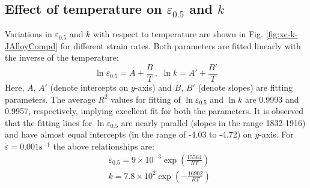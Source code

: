 \documentclass[a4paper, 11pt, dvipsnames]{article}
\begin{document}
\subsection{Effect of temperature on \texorpdfstring{$\varepsilon_{0.5}$}{e0.5} and \texorpdfstring{$k$}{k}}
Variations in $\varepsilon_{0.5}$ and $k$ with respect to temperature are shown in Fig. \ref{fig:xc-k-JAlloyCompd} for different strain rates. Both parameters are fitted linearly with the inverse of the temperature:
\begin{equation}\label{eq:e50-k-T}
\ln\varepsilon_{0.5} = A + \frac{B}{T} \, , \,\, \ln k = A' + \frac{B'}{T}
\end{equation}
Here, $A$, $A'$ (denote intercepts on $y$-axis) and $B$, $B'$ (denote slopes) are fitting parameters. The average $R^2$ values for fitting of $\ln\varepsilon_{0.5}$ and $\ln k$ are 0.9993 and 0.9957, respectively, implying excellent fit for both the parameters. It is observed that the fitting lines for $\ln\varepsilon_{0.5}$ are nearly parallel (slopes in the range 1832-1916) and have almost equal intercepts (in the range of -4.03 to -4.72) on $y$-axis. For $\dot{\varepsilon} = 0.001 \text{s}^{-1}$ the above relationships are:
\begin{equation}\label{e50-Q-DRX}
\begin{aligned}
&\varepsilon_{0.5} = 9\times 10^{-3}\exp\left(\frac{15564}{RT}\right) \\ &k = 7.8\times 10^{2}\exp\left(-\frac{16902}{RT}\right)
\end{aligned}
\end{equation}
\end{document}
